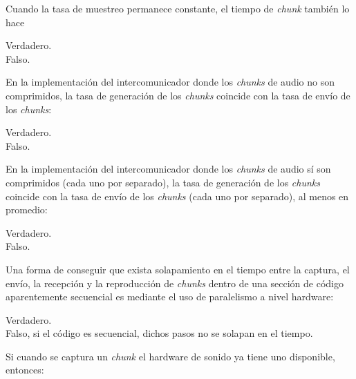 \documentclass[legalpaper, 12pt, addpoints]{exam}
\begin{document}
\begin{questions}
\vspace{0.10in}

\question Cuando la tasa de muestreo permanece constante, el tiempo de \emph{chunk} también lo hace

\begin{oneparchoices}
  \choice Verdadero.\\
  \choice Falso.
\end{oneparchoices}
  
\vspace{0.10in}

\question En la implementación del intercomunicador donde los \emph{chunks}
de audio no son comprimidos, la tasa de generación de los \emph{chunks}
coincide con la tasa de envío de los \emph{chunks}:

\begin{oneparchoices}
  \choice Verdadero.\\
  \choice Falso.
\end{oneparchoices}
  
\vspace{0.10in}

\question En la implementación del intercomunicador donde los
\emph{chunks} de audio sí son comprimidos (cada uno por separado), la
tasa de generación de los \emph{chunks} coincide con la tasa de envío
de los \emph{chunks} (cada uno por separado), al menos en promedio:

\begin{oneparchoices}
  \choice Verdadero.\\
  \choice Falso.
\end{oneparchoices}
  
\vspace{0.10in}

\question Una forma de conseguir que exista solapamiento en el tiempo
entre la captura, el envío, la recepción y la reproducción de
\emph{chunks} dentro de una sección de código aparentemente secuencial
es mediante el uso de paralelismo a nivel hardware:

\begin{oneparchoices}
  \choice Verdadero.\\
  \choice Falso, si el código es secuencial, dichos pasos no se solapan en el tiempo.
\end{oneparchoices}
  
\vspace{0.10in}

\question Si cuando se captura un \emph{chunk} el hardware de sonido ya tiene uno disponible, entonces:


\end{questions}
\end{document}
